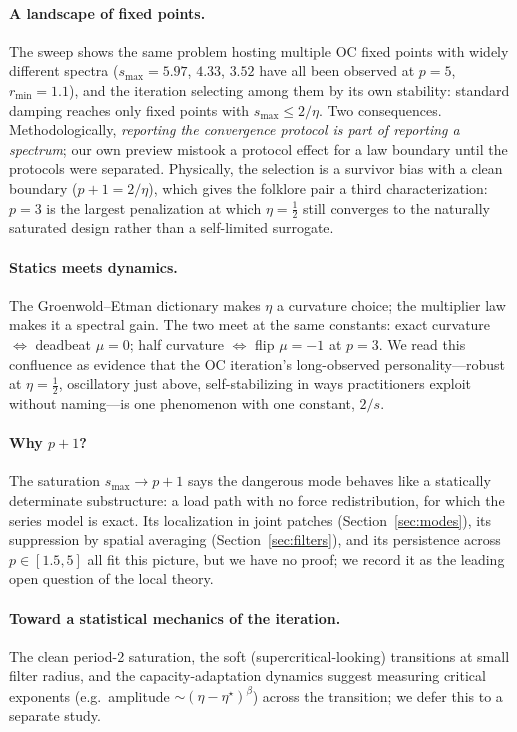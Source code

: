 \documentclass[11pt,a4paper]{article}
\newcommand{\smax}{s_{\max}}
\newcommand{\etastar}{\eta^{\star}}
\begin{document}
\paragraph{A landscape of fixed points.} The sweep shows the same problem
hosting multiple OC fixed points with widely different spectra
($\smax=5.97$, $4.33$, $3.52$ have all been observed at $p=5$,
$r_{\min}=1.1$), and the iteration selecting among them by its own
stability: standard damping reaches only fixed points with
$\smax\le2/\eta$. Two consequences. Methodologically, \emph{reporting the
convergence protocol is part of reporting a spectrum}; our own preview
mistook a protocol effect for a law boundary until the protocols were
separated. Physically, the selection is a survivor bias with a clean
boundary ($p{+}1=2/\eta$), which gives the folklore pair a third
characterization: $p=3$ is the largest penalization at which
$\eta=\tfrac12$ still converges to the naturally saturated design rather
than a self-limited surrogate.

\paragraph{Statics meets dynamics.} The Groenwold--Etman dictionary makes
$\eta$ a curvature choice; the multiplier law makes it a spectral gain.
The two meet at the same constants: exact curvature $\Leftrightarrow$
deadbeat $\mu=0$; half curvature $\Leftrightarrow$ flip $\mu=-1$ at
$p=3$. We read this confluence as evidence that the OC iteration's
long-observed personality---robust at $\eta=\tfrac12$, oscillatory just
above, self-stabilizing in ways practitioners exploit without naming---is
one phenomenon with one constant, $2/s$.

\paragraph{Why $p+1$?} The saturation $\smax\to p{+}1$ says the dangerous
mode behaves like a statically determinate substructure: a load path with
no force redistribution, for which the series model is exact. Its
localization in joint patches (Section~\ref{sec:modes}), its suppression
by spatial averaging (Section~\ref{sec:filters}), and its persistence
across $p\in[1.5,5]$ all fit this picture, but we have no proof; we record
it as the leading open question of the local theory.

\paragraph{Toward a statistical mechanics of the iteration.} The clean
period-2 saturation, the soft (supercritical-looking) transitions at small
filter radius, and the capacity-adaptation dynamics suggest measuring
critical exponents (e.g.\ amplitude ${\sim}(\eta-\etastar)^{\beta}$)
across the transition; we defer this to a separate study.
\end{document}
